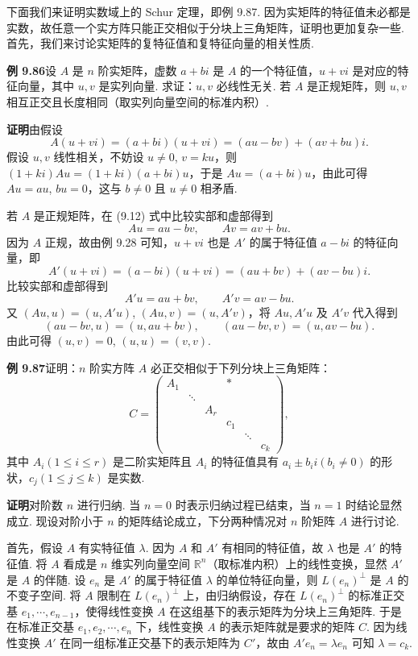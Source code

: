 \documentclass[UTF8,12pt,a4paper,fontset=fandol]{ctexart}
\begin{document}
下面我们来证明实数域上的 Schur 定理，即例 9.87. 因为实矩阵的特征值未必都是实数，故任意一个实方阵只能正交相似于分块上三角矩阵，证明也更加复杂一些. 首先，我们来讨论实矩阵的复特征值和复特征向量的相关性质.

\noindent\textbf{例 9.86}\quad 设 $A$ 是 $n$ 阶实矩阵，虚数 $a+bi$ 是 $A$ 的一个特征值，$u+vi$ 是对应的特征向量，其中 $u,v$ 是实列向量. 求证：$u,v$ 必线性无关. 若 $A$ 是正规矩阵，则 $u,v$ 相互正交且长度相同（取实列向量空间的标准内积）.

\noindent\textbf{证明}\quad 由假设
\begin{equation}
A(u+vi)=(a+bi)(u+vi)=(au-bv)+(av+bu)i.
\tag{9.12}
\end{equation}
假设 $u,v$ 线性相关，不妨设 $u\ne0$, $v=ku$，则 $(1+ki)Au=(1+ki)(a+bi)u$，于是 $Au=(a+bi)u$，由此可得 $Au=au$, $bu=0$，这与 $b\ne0$ 且 $u\ne0$ 相矛盾.

若 $A$ 是正规矩阵，在 (9.12) 式中比较实部和虚部得到
\[
Au=au-bv,\qquad Av=av+bu.
\]
因为 $A$ 正规，故由例 9.28 可知，$u+vi$ 也是 $A'$ 的属于特征值 $a-bi$ 的特征向量，即
\[
A'(u+vi)=(a-bi)(u+vi)=(au+bv)+(av-bu)i.
\]
比较实部和虚部得到
\[
A'u=au+bv,\qquad A'v=av-bu.
\]
又 $(Au,u)=(u,A'u)$, $(Au,v)=(u,A'v)$，将 $Au,A'u$ 及 $A'v$ 代入得到
\[
(au-bv,u)=(u,au+bv),\qquad (au-bv,v)=(u,av-bu).
\]
由此可得 $(u,v)=0$, $(u,u)=(v,v)$.

\noindent\textbf{例 9.87}\quad 证明：$n$ 阶实方阵 $A$ 必正交相似于下列分块上三角矩阵：
\[
C=\begin{pmatrix}
A_1&&&*\\
&\ddots&&\\
&&A_r&\\
&&&c_1\\
&&&&\ddots\\
&&&&&c_k
\end{pmatrix},
\]
其中 $A_i(1\le i\le r)$ 是二阶实矩阵且 $A_i$ 的特征值具有 $a_i\pm b_ii(b_i\ne0)$ 的形状，$c_j(1\le j\le k)$ 是实数.

\noindent\textbf{证明}\quad 对阶数 $n$ 进行归纳. 当 $n=0$ 时表示归纳过程已结束，当 $n=1$ 时结论显然成立. 现设对阶小于 $n$ 的矩阵结论成立，下分两种情况对 $n$ 阶矩阵 $A$ 进行讨论.

首先，假设 $A$ 有实特征值 $\lambda$. 因为 $A$ 和 $A'$ 有相同的特征值，故 $\lambda$ 也是 $A'$ 的特征值. 将 $A$ 看成是 $n$ 维实列向量空间 $\mathbb{R}^n$（取标准内积）上的线性变换，显然 $A'$ 是 $A$ 的伴随. 设 $e_n$ 是 $A'$ 的属于特征值 $\lambda$ 的单位特征向量，则 $L(e_n)^\perp$ 是 $A$ 的不变子空间. 将 $A$ 限制在 $L(e_n)^\perp$ 上，由归纳假设，存在 $L(e_n)^\perp$ 的标准正交基 $e_1,\cdots,e_{n-1}$，使得线性变换 $A$ 在这组基下的表示矩阵为分块上三角矩阵. 于是在标准正交基 $e_1,e_2,\cdots,e_n$ 下，线性变换 $A$ 的表示矩阵就是要求的矩阵 $C$. 因为线性变换 $A'$ 在同一组标准正交基下的表示矩阵为 $C'$，故由 $A'e_n=\lambda e_n$ 可知 $\lambda=c_k$.
\end{document}
